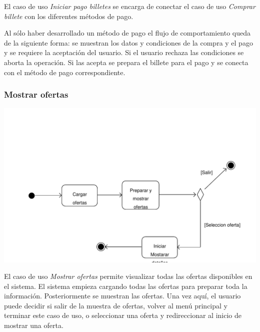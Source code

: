 \documentclass[11pt, a4paper, twoside, titlepage]{article}
\begin{document}
				El caso de uso {\itshape Iniciar pago billetes} se encarga de conectar el caso de uso {\itshape Comprar billete} con los diferentes métodos de pago.

				Al sólo haber desarrollado un método de pago el flujo de comportamiento queda de la siguiente forma: se muestran los datos y condiciones de la compra y el pago y se requiere la aceptación del usuario. Si el usuario rechaza las condiciones se aborta la operación. Si las acepta se prepara el billete para el pago y se conecta con el método de pago correspondiente.

			\subsubsection{Mostrar ofertas}
				\begin{center}
				\includegraphics[scale=.72]{analisis/diagramas/da_mostrarofertas.pdf}
				\end{center}
				El caso de uso {\itshape Mostrar ofertas} permite visualizar todas las ofertas disponibles en el sistema. 
				El sistema empieza cargando todas las ofertas para preparar toda la información. Posteriormente se muestran las ofertas. Una vez aquí, el usuario puede decidir si salir de la muestra de ofertas, volver al menú principal y terminar este caso de uso, o seleccionar una oferta y redireccionar al inicio de mostrar una oferta.
\end{document}

